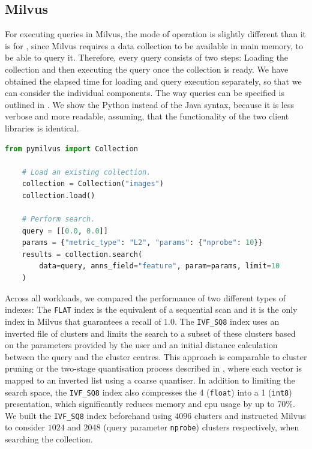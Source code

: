 \subsection{Milvus}
For executing queries in Milvus, the mode of operation is slightly different than it is for \cottontail, since Milvus requires a data collection to be available in main memory, to be able to query it. Therefore, every query consists of two steps: Loading the collection and then executing the query once the collection is ready. We have obtained the elapsed time for loading and query execution separately, so that we can consider the individual components. The way queries can be specified is outlined in . We show the Python instead of the Java syntax, because it is less verbose and more readable, assuming, that the functionality of the two client libraries is identical.  

\begin{lstlisting}[language=Python, caption={Example of a similarity search query in a collection ``images'' using a two-dimensional query vector and the Euclidean distance. Before executing the query, the data collection must be loaded.}, label=listing:milvus_query, numbers=none]
    from pymilvus import Collection
    
    # Load an existing collection.
    collection = Collection("images")      
    collection.load()

    # Perform search.
    query = [[0.0, 0.0]]
    params = {"metric_type": "L2", "params": {"nprobe": 10}}
    results = collection.search(
        data=query, anns_field="feature", param=params, limit=10
    )
\end{lstlisting}

Across all workloads, we compared the performance of two different types of indexes: The \texttt{FLAT} index is the equivalent of a sequential scan and it is the only index in Milvus that guarantees a recall of $1.0$. The \texttt{IVF\_SQ8} index uses an inverted file of clusters and limits the search to a subset of these clusters based on the parameters provided by the user and an initial distance calculation between the query and the cluster centres. This approach is comparable to cluster pruning \cite{Chierichetti:2007Finding} or the two-stage quantisation process described in \cite{Jegou:2010Product}, where each vector is mapped to an inverted list using a coarse quantiser. In addition to limiting the search space, the \texttt{IVF\_SQ8} index also compresses the \SI{4}{\byte} (\texttt{float}) into a \SI{1}{\byte} (\texttt{int8}) presentation, which significantly reduces memory and \acrshort{cpu} usage by up to 70\%. We built the \texttt{IVF\_SQ8} index beforehand using $4096$ clusters and instructed Milvus to consider $1024$ and $2048$ (query parameter \texttt{nprobe}) clusters respectively, when searching the collection.

